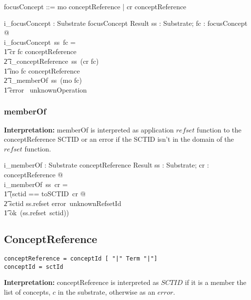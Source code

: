 \documentclass{article}
\begin{document}
\begin{zed}
focusConcept ::= mo \ldata conceptReference \rdata | cr \ldata conceptReference \rdata
\end{zed}

\begin{gendef}
   i\_focusConcept : Substrate \fun focusConcept \fun Result
\where
   \forall ss : Substrate; fc : focusConcept @ \\
i\_focusConcept~ss~fc = \\
\t1 \IF cr \inv fc \in conceptReference \\
\t2 \THEN i\_conceptReference~ss~(cr \inv fc) \\
\t1 \ELSE \IF mo \inv fc \in conceptReference \\
\t2 \THEN i\_memberOf~ss~(mo \inv fc) \\
\t1 \ELSE error~ unknownOperation
\end{gendef}

\subsubsection{memberOf}
\textbf{Interpretation:} memberOf is interpreted as application $refset$ function to the conceptReference SCTID or an error if the SCTID isn't in the domain of the $refset$ function.

\begin{gendef}
   i\_memberOf : Substrate \fun conceptReference \fun Result
\where
   \forall ss : Substrate; cr : conceptReference @ \\
i\_memberOf~ss~cr = \\
\t1 (\LET sctid == toSCTID~cr @ \\
\t2 \IF sctid \notin \dom ss.refset \THEN error~unknownRefsetId \\
\t1 \ELSE ok~(ss.refset~sctid))
\end{gendef}

\subsection{ConceptReference}
\begin{verbatim}
conceptReference = conceptId [ "|" Term "|"]
conceptId = sctId
\end{verbatim}
\textbf{Interpretation:}  conceptReference is interpreted as $SCTID$ if it is a member the list of concepts, $c$
in the substrate, otherwise as an $error$.

\begin{zed}
[conceptReference]
\end{zed}
\end{document}
